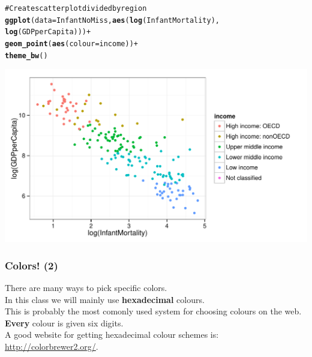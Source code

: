 \documentclass{beamer}\usepackage{graphicx, color}
\makeatletter
\def\maxwidth{ %
  \ifdim\Gin@nat@width>\linewidth
    \linewidth
  \else
    \Gin@nat@width
  \fi
}
\newcommand{\hlfunctioncall}[1]{\textcolor[rgb]{0.501960784313725,0,0.329411764705882}{\textbf{#1}}}%
\newcommand{\hlcomment}[1]{\textcolor[rgb]{0.180392156862745,0.6,0.341176470588235}{#1}}%
\newenvironment{kframe}{%
 \def\at@end@of@kframe{}%
 \ifinner\ifhmode%
  \def\at@end@of@kframe{\end{minipage}}%
  \begin{minipage}{\columnwidth}%
 \fi\fi%
 \def\FrameCommand##1{\hskip\@totalleftmargin \hskip-\fboxsep
 \colorbox{shadecolor}{##1}\hskip-\fboxsep
     \hskip-\linewidth \hskip-\@totalleftmargin \hskip\columnwidth}%
 \MakeFramed {\advance\hsize-\width
   \@totalleftmargin\z@ \linewidth\hsize
   \@setminipage}}%
 {\par\unskip\endMakeFramed%
 \at@end@of@kframe}
\newenvironment{knitrout}{}{} %
\makeatother
\begin{document}

\begin{frame}
\begin{knitrout}
\color{fgcolor}\begin{kframe}
\begin{alltt}
\hlcomment{# Create scatter plot divided by region}
\hlfunctioncall{ggplot}(data = InfantNoMiss, \hlfunctioncall{aes}(\hlfunctioncall{log}(InfantMortality),
                                \hlfunctioncall{log}(GDPperCapita))) +
      \hlfunctioncall{geom_point}(\hlfunctioncall{aes}(colour = income)) + 
      \hlfunctioncall{theme_bw}()
\end{alltt}
\end{kframe}

{\centering \includegraphics[width=\maxwidth]{figure/ScatterColour1} 

}


\end{knitrout}

\end{frame}

\begin{frame}[fragile]
  \frametitle{Colors! (2)}
  There are many ways to pick specific colors. \\[0.5cm]
  In this class we will mainly use {\bf{hexadecimal}} colours. \\[0,25cm]
  This is probably the most comonly used system for choosing colours on the web.\\[0.5cm]
  {\bf{Every}} colour is given six digits. \\[0.25cm]
  A good website for getting hexadecimal colour schemes is: \url{http://colorbrewer2.org/}.
\end{frame}
\end{document}
